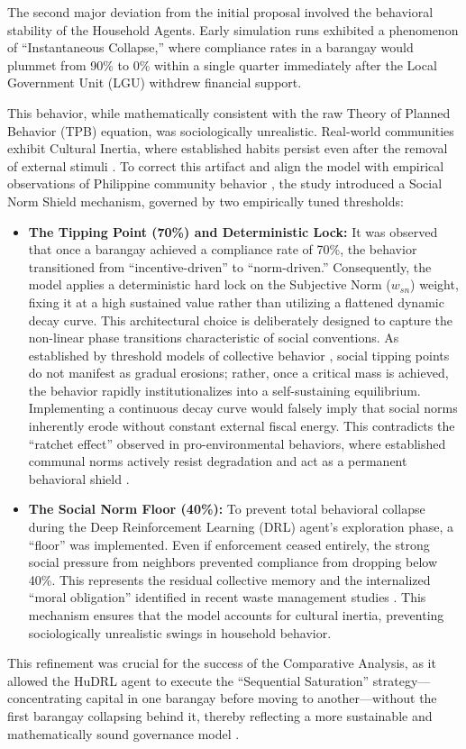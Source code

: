 The second major deviation from the initial proposal involved the behavioral stability of the Household Agents. Early simulation runs exhibited a phenomenon of ``Instantaneous Collapse,'' where compliance rates in a barangay would plummet from 90\% to 0\% within a single quarter immediately after the Local Government Unit (LGU) withdrew financial support.

This behavior, while mathematically consistent with the raw Theory of Planned Behavior (TPB) equation, was sociologically unrealistic. Real-world communities exhibit Cultural Inertia, where established habits persist even after the removal of external stimuli \citep{Nishimura2022}. To correct this artifact and align the model with empirical observations of Philippine community behavior \citep{Yazawa2025}, the study introduced a Social Norm Shield mechanism, governed by two empirically tuned thresholds:

\begin{itemize}
    \item \textbf{The Tipping Point (70\%) and Deterministic Lock:} It was observed that once a barangay achieved a compliance rate of 70\%, the behavior transitioned from ``incentive-driven'' to ``norm-driven.'' Consequently, the model applies a deterministic hard lock on the Subjective Norm ($w_{sn}$) weight, fixing it at a high sustained value rather than utilizing a flattened dynamic decay curve. This architectural choice is deliberately designed to capture the non-linear phase transitions characteristic of social conventions. As established by threshold models of collective behavior \citep{Granovetter1978, Centola2018}, social tipping points do not manifest as gradual erosions; rather, once a critical mass is achieved, the behavior rapidly institutionalizes into a self-sustaining equilibrium. Implementing a continuous decay curve would falsely imply that social norms inherently erode without constant external fiscal energy. This contradicts the ``ratchet effect'' observed in pro-environmental behaviors, where established communal norms actively resist degradation and act as a permanent behavioral shield \citep{Andre2021, Nyborg2024}.
    
    \item \textbf{The Social Norm Floor (40\%):} To prevent total behavioral collapse during the Deep Reinforcement Learning (DRL) agent's exploration phase, a ``floor'' was implemented. Even if enforcement ceased entirely, the strong social pressure from neighbors prevented compliance from dropping below 40\%. This represents the residual collective memory and the internalized ``moral obligation'' identified in recent waste management studies \citep{Zheng2022}. This mechanism ensures that the model accounts for cultural inertia, preventing sociologically unrealistic swings in household behavior.
\end{itemize}

This refinement was crucial for the success of the Comparative Analysis, as it allowed the HuDRL agent to execute the ``Sequential Saturation'' strategy---concentrating capital in one barangay before moving to another---without the first barangay collapsing behind it, thereby reflecting a more sustainable and mathematically sound governance model \citep{Abdallah2021}.